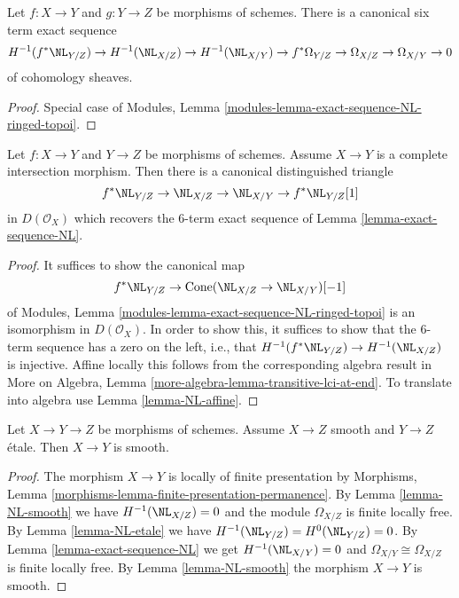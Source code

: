 \begin{lemma}
\label{lemma-exact-sequence-NL}
Let $f : X \to Y$ and $g : Y \to Z$ be morphisms of schemes.
There is a canonical six term exact sequence
$$
H^{-1}(f^*\NL_{Y/Z}) \to
H^{-1}(\NL_{X/Z}) \to
H^{-1}(\NL_{X/Y}) \to
f^*\Omega_{Y/Z} \to \Omega_{X/Z} \to \Omega_{X/Y} \to 0
$$
of cohomology sheaves.
\end{lemma}

\begin{proof}
Special case of
Modules, Lemma \ref{modules-lemma-exact-sequence-NL-ringed-topoi}.
\end{proof}

\begin{lemma}
\label{lemma-get-triangle-NL}
Let $f : X \to Y$ and $Y \to Z$ be morphisms of schemes. Assume
$X \to Y$ is a complete intersection morphism. Then there is
a canonical distinguished triangle
$$
f^*\NL_{Y/Z} \to \NL_{X/Z} \to \NL_{X/Y} \to f^*\NL_{Y/Z}[1]
$$
in $D(\mathcal{O}_X)$ which recovers the $6$-term exact sequence of
Lemma \ref{lemma-exact-sequence-NL}.
\end{lemma}

\begin{proof}
It suffices to show the canonical map
$$
f^*\NL_{Y/Z} \to \text{Cone}(\NL_{X/Z} \to \NL_{X/Y})[-1]
$$
of Modules, Lemma \ref{modules-lemma-exact-sequence-NL-ringed-topoi}
is an isomorphism in $D(\mathcal{O}_X)$. In order to show this, it
suffices to show that the $6$-term sequence has
a zero on the left, i.e., that $H^{-1}(f^*\NL_{Y/Z}) \to H^{-1}(\NL_{X/Z})$
is injective. Affine locally this follows from the corresponding
algebra result in More on Algebra, Lemma
\ref{more-algebra-lemma-transitive-lci-at-end}.
To translate into algebra use Lemma \ref{lemma-NL-affine}.
\end{proof}

\begin{lemma}
\label{lemma-smooth-etale-permanence}
Let $X \to Y \to Z$ be morphisms of schemes. Assume $X \to Z$ smooth
and $Y \to Z$ \'etale. Then $X \to Y$ is smooth.
\end{lemma}

\begin{proof}
The morphism $X \to Y$ is locally of finite presentation by
Morphisms, Lemma \ref{morphisms-lemma-finite-presentation-permanence}.
By Lemma \ref{lemma-NL-smooth} we have $H^{-1}(\NL_{X/Z}) = 0$
and the module $\Omega_{X/Z}$ is finite locally free.
By Lemma \ref{lemma-NL-etale} we have
$H^{-1}(\NL_{Y/Z}) = H^0(\NL_{Y/Z}) = 0$.
By Lemma \ref{lemma-exact-sequence-NL} we get
$H^{-1}(\NL_{X/Y}) = 0$ and $\Omega_{X/Y} \cong \Omega_{X/Z}$
is finite locally free.
By Lemma \ref{lemma-NL-smooth} the morphism $X \to Y$ is smooth.
\end{proof}

